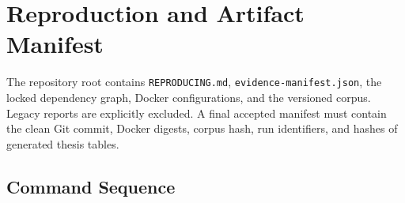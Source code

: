 \appendix
\chapter{Reproduction and Artifact Manifest}

The repository root contains \texttt{REPRODUCING.md}, \texttt{evidence-manifest.json}, the locked dependency graph, Docker configurations, and the versioned corpus. Legacy reports are explicitly excluded. A final accepted manifest must contain the clean Git commit, Docker digests, corpus hash, run identifiers, and hashes of generated thesis tables.

\section{Command Sequence}

